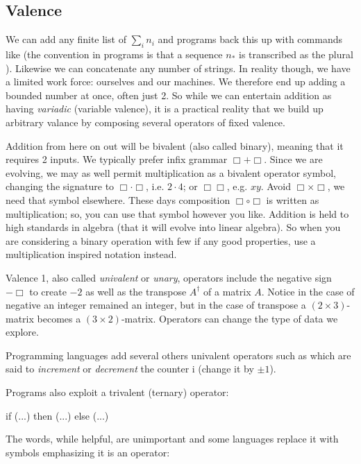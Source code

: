 
\subsection{Valence}
We can add any finite list of $\sum_{i} n_i$ and 
programs back this up with commands like  
(the convention in programs is that a sequence $n_*$ is transcribed as 
the plural ).  Likewise we can concatenate any 
number of strings.  In reality though, we have a limited work force:
ourselves and our machines. We therefore end up adding a bounded number at once,
often just 2.  So while we can entertain addition as having 
\emph{variadic} (variable valence), it is a practical reality that 
we build up arbitrary valance by composing several operators of 
fixed valence.

Addition from here on out will be bivalent (also called binary), meaning 
that it requires 2 inputs.  We typically prefer infix grammar $\Box +\Box$.
Since we are evolving, we may as well permit multiplication as a bivalent operator
symbol, changing the signature to $\Box \cdot \Box$, i.e. $2\cdot 4$; or
$\Box\Box$, e.g. $xy$.   Avoid $\Box\times \Box$, we need that symbol elsewhere.
These days composition $\Box\circ\Box$ is written as multiplication; so, you can
use that symbol however you like.  Addition is held to high standards in algebra
(that it will evolve into linear algebra).  So when you are considering a binary
operation with few if any good properties, use a multiplication inspired
notation instead.   




 Valence
1, also called \emph{univalent} or \emph{unary}, operators include the negative
sign $-\Box$ to create $-2$ as well as the transpose $A^{\dagger}$ of a matrix
$A$. Notice in the case of negative an integer remained an integer, but in the
case of transpose a $(2\times 3)$-matrix becomes a $(3\times 2)$-matrix.
Operators can change the type of data we explore.
 
Programming languages add several others univalent operators
such as  which are said to \emph{increment} 
or \emph{decrement} the counter i (change it by $\pm 1$).

Programs also exploit a trivalent (ternary) operator:
\begin{center}
\begin{Pcode}[]
if (...) then (...) else (...)
\end{Pcode}
\end{center}
The words, while helpful, are unimportant and some languages
replace it with symbols emphasizing it is an operator:
\begin{center}
\end{center}

